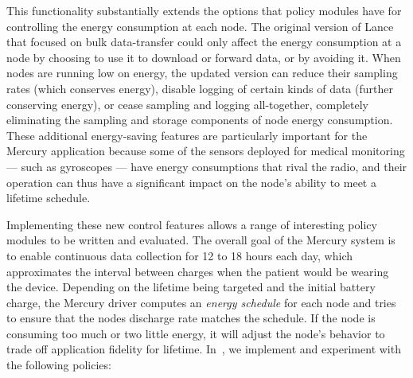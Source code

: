 This functionality substantially extends the options that policy modules have
for controlling the energy consumption at each node. The original version of
Lance that focused on bulk data-transfer could only affect the energy
consumption at a node by choosing to use it to download or forward data, or
by avoiding it. When nodes are running low on energy, the updated version can
reduce their sampling rates (which conserves energy), disable logging of
certain kinds of data (further conserving energy), or cease sampling and
logging all-together, completely eliminating the sampling and storage
components of node energy consumption. These additional energy-saving
features are particularly important for the Mercury application because some
of the sensors deployed for medical monitoring --- such as gyroscopes ---
have energy consumptions that rival the radio, and their operation can thus
have a significant impact on the node's ability to meet a lifetime schedule.

Implementing these new control features allows a range of interesting policy
modules to be written and evaluated. The overall goal of the Mercury system
is to enable continuous data collection for 12 to 18 hours each day, which
approximates the interval between charges when the patient would be wearing
the device. Depending on the lifetime being targeted and the initial battery
charge, the Mercury driver computes an \textit{energy schedule} for each node
and tries to ensure that the nodes discharge rate matches the schedule. If
the node is consuming too much or two little energy, it will adjust the
node's behavior to trade off application fidelity for lifetime.
In~\cite{mercury-sensys09}, we implement and experiment with the following
policies:

